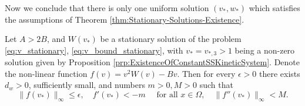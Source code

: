\documentclass[review,onefignum,onetabnum]{SIAM-styles/siamart171218}
\begin{document}
Now we conclude that there is only one uniform solution $(v_*, w_*)$ which satisfies the assumptions of Theorem \ref{thm:Stationary-Solutions-Existence}.

\begin{prp}
    \label{prp:nonlinearity_f_properties_at_v_star}
    Let $A > 2B$, and $W(v_*)$ be a stationary solution of the problem \eqref{eq:v_stationary}, \eqref{eq:v_bound_stationary}, with $v_* = v_{*, 3} > 1$ being a non-zero solution given by Proposition \ref{prp:ExistenceOfConstantSSKineticSystem}. Denote the non-linear function $f(v) = v^2W(v) - Bv$. Then for every $\epsilon > 0$ there exists $d_w > 0$, sufficiently small, and numbers $m > 0, M >0$ such that
    \begin{equation}
        \label{eq:nonlinearity_f_condition_existence}
        \|f(v_*)\|_\infty \leq \epsilon, 
        \quad
        f'(v_*) < -m
        \quad
        \text{ for all }
        x \in \Omega,
        \quad
        \|f''(v_*)\|_\infty < M.
    \end{equation}
\end{prp}
\end{document}
